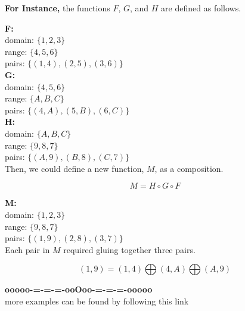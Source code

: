 \documentclass{ximera}
\begin{document}
\textbf{For Instance,} the functions $F$, $G$, and $H$ are defined as follows.



\textbf{F:} \\
domain: $\{ 1, 2, 3 \}$ \\
range: $\{ 4, 5, 6 \}$ \\
pairs: $\{ (1, 4), (2, 5) , (3, 6) \}$ \\


\textbf{G:} \\
domain: $\{ 4, 5, 6 \}$ \\
range: $\{ A, B, C \}$ \\
pairs: $\{ (4, A), (5, B), (6, C) \}$ \\



\textbf{H:} \\
domain: $\{ A, B, C \}$ \\
range: $\{ 9, 8, 7 \}$ \\
pairs: $\{ (A, 9), (B, 8), (C, 7) \}$ \\



Then, we could define a new function, $M$, as a composition.

\[ M = H \circ G \circ F \]



\textbf{M:} \\
domain: $\{ 1, 2, 3 \}$ \\
range: $\{ 9, 8, 7 \}$ \\
pairs: $\{ (1, 9), (2, 8) , (3, 7) \}$ \\


Each pair in $M$ required gluing together three pairs.


\[ (1, 9) = (1,4) \bigoplus (4, A) \bigoplus (A, 9) \]











\begin{onlineOnly}
\begin{center}
\textbf{\textcolor{green!50!black}{ooooo-=-=-=-ooOoo-=-=-=-ooooo}} \\

more examples can be found by following this link\\ 

\end{center}
\end{onlineOnly}
\end{document}

